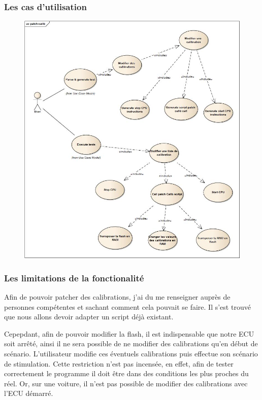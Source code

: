 \subsubsection{Les cas d'utilisation}

\begin{figure}[H]
\includegraphics[width=16cm]{contents/images/patch-calib.jpg}
\end{figure}

\subsubsection{Les limitations de la fonctionalité}
Afin de pouvoir patcher des calibrations, j'ai du me renseigner auprès de personnes compétentes et sachant comment cela pouvait se faire. Il s'est trouvé que nous allons devoir adapter un script déjà existant.

Cepepdant, afin de pouvoir modifier la flash, il est indispensable que notre ECU soit arrêté, ainsi il ne sera possible de ne modifier des calibrations qu'en début de scénario. L'utilisateur modifie ces éventuels calibrations puis effectue son scénario de stimulation. Cette restriction n'est pas incensée, en effet, afin de tester correctement le programme il doit être dans des conditions les plus proches du réel. Or, sur une voiture, il n'est pas possible de modifier des calibrations avec l'ECU démarré.


